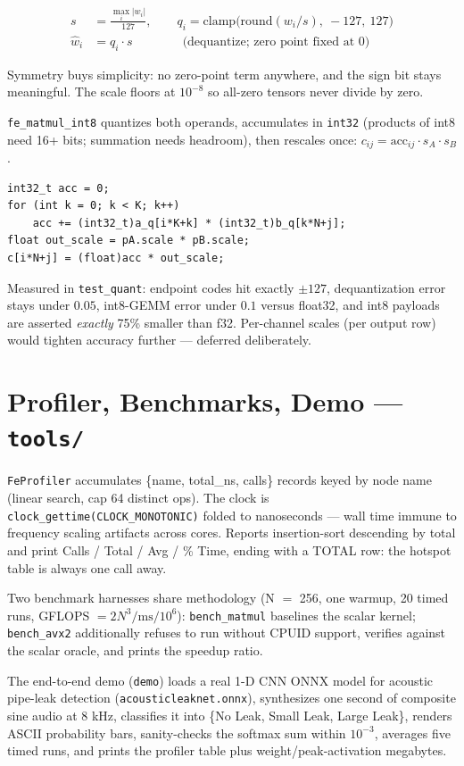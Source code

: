 \documentclass[11pt,a4paper]{article}
\begin{document}
\begin{align}
s &= \frac{\max_i |w_i|}{127}, \qquad q_i = \mathrm{clamp}\big(\mathrm{round}(w_i / s),\ -127,\ 127\big) \\
\hat w_i &= q_i \cdot s \qquad\qquad\text{(dequantize; zero point fixed at 0)}
\end{align}

Symmetry buys simplicity: no zero-point term anywhere, and the sign bit stays
meaningful. The scale floors at $10^{-8}$ so all-zero tensors never divide by
zero.

\texttt{fe\_matmul\_int8} quantizes both operands, accumulates in
\texttt{int32} (products of int8 need 16+ bits; summation needs headroom), then
rescales once:
$c_{ij} = \text{acc}_{ij} \cdot s_A \cdot s_B$.

\begin{lstlisting}[style=cstyle]
int32_t acc = 0;
for (int k = 0; k < K; k++)
    acc += (int32_t)a_q[i*K+k] * (int32_t)b_q[k*N+j];
float out_scale = pA.scale * pB.scale;
c[i*N+j] = (float)acc * out_scale;
\end{lstlisting}

Measured in \texttt{test\_quant}: endpoint codes hit exactly $\pm 127$,
dequantization error stays under $0.05$, int8-GEMM error under $0.1$ versus
float32, and int8 payloads are asserted \emph{exactly} 75\% smaller than f32.
Per-channel scales (per output row) would tighten accuracy further --- deferred
deliberately.

\section{Profiler, Benchmarks, Demo --- \texttt{tools/}}

\texttt{FeProfiler} accumulates \{name, total\_ns, calls\} records keyed by node
name (linear search, cap 64 distinct ops). The clock is
\texttt{clock\_gettime(CLOCK\_MONOTONIC)} folded to nanoseconds --- wall time
immune to frequency scaling artifacts across cores. Reports insertion-sort
descending by total and print Calls / Total / Avg / \% Time, ending with a TOTAL
row: the hotspot table is always one call away.

Two benchmark harnesses share methodology (N $=$ 256, one warmup, 20 timed
runs, GFLOPS $= 2N^3 / \text{ms} / 10^6$): \texttt{bench\_matmul} baselines the
scalar kernel; \texttt{bench\_avx2} additionally refuses to run without CPUID
support, verifies against the scalar oracle, and prints the speedup ratio.

The end-to-end demo (\texttt{demo}) loads a real 1-D CNN ONNX model for acoustic
pipe-leak detection (\texttt{acousticleaknet.onnx}), synthesizes one second of
composite sine audio at 8 kHz, classifies it into \{No Leak, Small Leak, Large
Leak\}, renders ASCII probability bars, sanity-checks the softmax sum within
$10^{-3}$, averages five timed runs, and prints the profiler table plus
weight/peak-activation megabytes.
\end{document}
